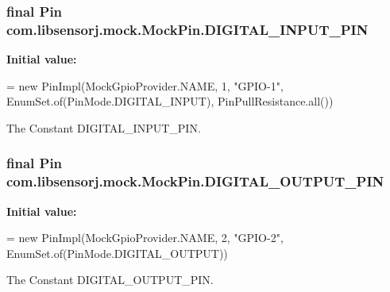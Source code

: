 \subsubsection[{D\+I\+G\+I\+T\+A\+L\+\_\+\+I\+N\+P\+U\+T\+\_\+\+P\+I\+N}]{\setlength{\rightskip}{0pt plus 5cm}final Pin com.\+libsensorj.\+mock.\+Mock\+Pin.\+D\+I\+G\+I\+T\+A\+L\+\_\+\+I\+N\+P\+U\+T\+\_\+\+P\+I\+N\hspace{0.3cm}{\ttfamily [static]}}\label{classcom_1_1libsensorj_1_1mock_1_1MockPin_ab3330359048ec50eec255e0ab6309f48}
{\bfseries Initial value\+:}
\begin{DoxyCode}
= \textcolor{keyword}{new} PinImpl(MockGpioProvider.NAME, 1, \textcolor{stringliteral}{"GPIO-1"}, 
                                                      EnumSet.of(PinMode.DIGITAL\_INPUT),
                                                      PinPullResistance.all())
\end{DoxyCode}
The Constant D\+I\+G\+I\+T\+A\+L\+\_\+\+I\+N\+P\+U\+T\+\_\+\+P\+I\+N. \hypertarget{classcom_1_1libsensorj_1_1mock_1_1MockPin_ae16d327cdbddbbdeb9314b6b28a52e82}{}
\subsubsection[{D\+I\+G\+I\+T\+A\+L\+\_\+\+O\+U\+T\+P\+U\+T\+\_\+\+P\+I\+N}]{\setlength{\rightskip}{0pt plus 5cm}final Pin com.\+libsensorj.\+mock.\+Mock\+Pin.\+D\+I\+G\+I\+T\+A\+L\+\_\+\+O\+U\+T\+P\+U\+T\+\_\+\+P\+I\+N\hspace{0.3cm}{\ttfamily [static]}}\label{classcom_1_1libsensorj_1_1mock_1_1MockPin_ae16d327cdbddbbdeb9314b6b28a52e82}
{\bfseries Initial value\+:}
\begin{DoxyCode}
= \textcolor{keyword}{new} PinImpl(MockGpioProvider.NAME, 2, \textcolor{stringliteral}{"GPIO-2"}, 
                                                            EnumSet.of(PinMode.DIGITAL\_OUTPUT))
\end{DoxyCode}
The Constant D\+I\+G\+I\+T\+A\+L\+\_\+\+O\+U\+T\+P\+U\+T\+\_\+\+P\+I\+N. \hypertarget{classcom_1_1libsensorj_1_1mock_1_1MockPin_af15fcc7a04ad7751ca96f968d1ac1b91}{}

